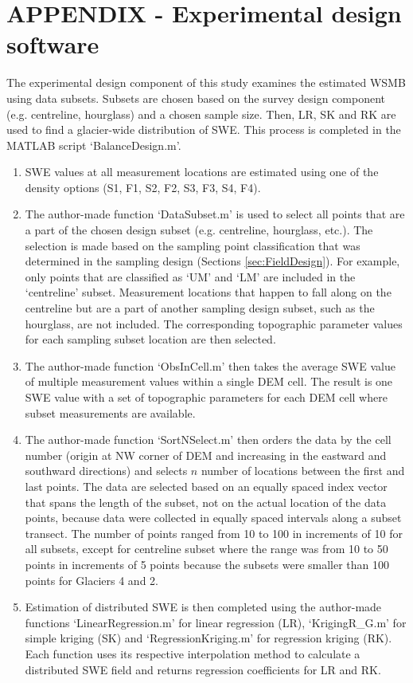 \documentclass[12pt]{article}
\begin{document}
\section*{APPENDIX - Experimental design software}
\label{app:Subsets}
The experimental design component of this study examines the estimated WSMB using data subsets. Subsets are chosen based on the survey design component (e.g. centreline, hourglass) and a chosen sample size. Then, LR, SK and RK are used to find a glacier-wide distribution of SWE. This process is completed in the MATLAB script `BalanceDesign.m'. 
\begin{enumerate}
\item SWE values at all measurement locations are estimated using one of the density options (S1, F1, S2, F2, S3, F3, S4, F4).
\item The author-made function `DataSubset.m' is used to select all points that are a part of the chosen design subset (e.g. centreline, hourglass, etc.). The selection is made based on the sampling point classification that was determined in the sampling design (Sections \ref{sec:FieldDesign}). For example, only points that are classified as `UM' and `LM' are included in the `centreline' subset. Measurement locations that happen to fall along on the centreline but are a part of another sampling design subset, such as the hourglass, are not included. The corresponding topographic parameter values for each sampling subset location are then selected. 
\item The author-made function `ObsInCell.m' then takes the average SWE value of multiple measurement values within a single DEM cell. The result is one SWE value with a set of topographic parameters for each DEM cell where subset measurements are available.
\item The author-made function `SortNSelect.m' then orders the data by the cell number (origin at NW corner of DEM and increasing in the eastward and southward directions) and selects $n$ number of locations between the first and last points. The data are selected based on an equally spaced index vector that spans the length of the subset, not on the actual location of the data points, because data were collected in equally spaced intervals along a subset transect. The number of points ranged from 10 to 100 in increments of 10 for all subsets, except for centreline subset where the range was from 10 to 50 points in increments of 5 points because the subsets were smaller than 100 points for Glaciers 4 and 2. 
\item Estimation of distributed SWE is then completed using the author-made functions `LinearRegression.m' for linear regression (LR), `KrigingR\_G.m' for simple kriging (SK) and `RegressionKriging.m' for regression kriging (RK). Each function uses its respective interpolation method to calculate a distributed SWE field and returns regression coefficients for LR and RK. 
\end{enumerate}
\end{document}
